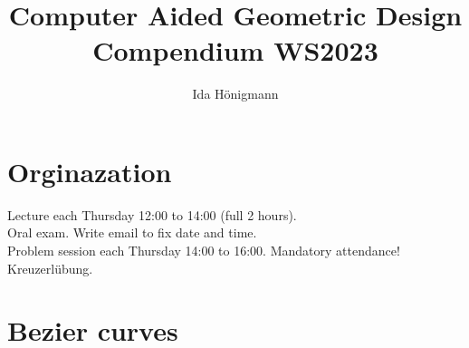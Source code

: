 \documentclass[]{article}
\begin{document}
	
	\title{Computer Aided Geometric Design Compendium WS2023}
	\author{Ida Hönigmann}
	
	\maketitle

\section*{Orginazation}
Lecture each Thursday 12:00 to 14:00 (full 2 hours).
\\
Oral exam. Write email to fix date and time.
\\
Problem session each Thursday 14:00 to 16:00. Mandatory attendance!
\\
Kreuzerlübung.

\section{Bezier curves}
\end{document}
